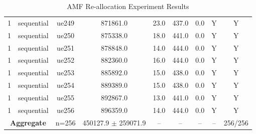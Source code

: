 \begin{table}[ht]
\begin{tabular}{|c|c|c|c|c|c|c|c|c|}
1 & sequential & ue249 & 871861.0 & 23.0 & 437.0 & 0.0 & Y & Y \\
1 & sequential & ue250 & 875338.0 & 18.0 & 441.0 & 0.0 & Y & Y \\
1 & sequential & ue251 & 878848.0 & 14.0 & 444.0 & 0.0 & Y & Y \\
1 & sequential & ue252 & 882360.0 & 16.0 & 444.0 & 0.0 & Y & Y \\
1 & sequential & ue253 & 885892.0 & 15.0 & 438.0 & 0.0 & Y & Y \\
1 & sequential & ue254 & 889389.0 & 15.0 & 438.0 & 0.0 & Y & Y \\
1 & sequential & ue255 & 892867.0 & 13.0 & 441.0 & 0.0 & Y & Y \\
1 & sequential & ue256 & 896359.0 & 14.0 & 444.0 & 0.0 & Y & Y \\
\multicolumn{2}{|c|}{\textbf{Aggregate}} & n=256 & 450127.9 $\pm$ 259071.9 & -- & -- & -- & -- & 256/256 \\
\hline
\end{tabular}
\caption{AMF Re-allocation Experiment Results}
\label{tab:amf_realloc}
\end{table}
